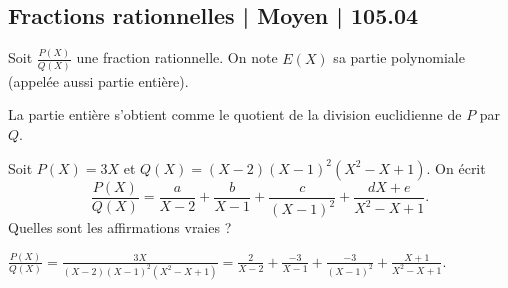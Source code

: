 \subsection{Fractions rationnelles | Moyen | 105.04}


\begin{question}

Soit $\frac{P(X)}{Q(X)}$ une fraction rationnelle. On note $E(X)$ sa partie polynomiale (appelée aussi partie entière).
\begin{answers}



\end{answers}
\begin{explanations}
La partie entière s'obtient comme le quotient de la division euclidienne de $P$ par $Q$.
\end{explanations}
\end{question}


\begin{question}

Soit $P(X)=3X$ et $Q(X) = (X-2)(X-1)^2(X^2-X+1)$.
On écrit 
$$\frac{P(X)}{Q(X)} = \frac{a}{X-2} + \frac{b}{X-1} +  \frac{c}{(X-1)^2}
+ \frac{dX+e}{X^2-X+1}.$$
Quelles sont les affirmations vraies ? 
\begin{answers}



\end{answers}
\begin{explanations}
$\frac{P(X)}{Q(X)} = \frac{3X}{(X-2)(X-1)^2(X^2-X+1)}
=\frac{2}{X-2} + \frac{-3}{X-1} +  \frac{-3}{(X-1)^2}
+ \frac{X+1}{X^2-X+1}$.
\end{explanations}
\end{question}



